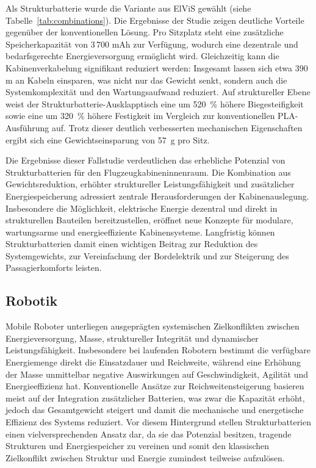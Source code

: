 Als Strukturbatterie wurde die Variante aus ElViS gewählt (siehe Tabelle~\ref{tab:combinations}). 
Die Ergebnisse der Studie zeigen deutliche Vorteile gegenüber der konventionellen Lösung. Pro Sitzplatz steht eine zusätzliche Speicherkapazität von 3\,700 mAh zur Verfügung, wodurch eine dezentrale und bedarfsgerechte Energieversorgung ermöglicht wird. Gleichzeitig kann die Kabinenverkabelung signifikant reduziert werden: Insgesamt lassen sich etwa 390 m an Kabeln einsparen, was nicht nur das Gewicht senkt, sondern auch die Systemkomplexität und den Wartungsaufwand reduziert. Auf struktureller Ebene weist der Strukturbatterie-Ausklapptisch eine um 520~\% höhere Biegesteifigkeit sowie eine um 320~\% höhere Festigkeit im Vergleich zur konventionellen PLA-Ausführung auf. Trotz dieser deutlich verbesserten mechanischen Eigenschaften ergibt sich eine Gewichtseinsparung von 57~g pro Sitz.

Die Ergebnisse dieser Fallstudie verdeutlichen das erhebliche Potenzial von Strukturbatterien für den Flugzeugkabineninnenraum. Die Kombination aus Gewichtsreduktion, erhöhter struktureller Leistungsfähigkeit und zusätzlicher Energiespeicherung adressiert zentrale Herausforderungen der Kabinenauslegung. Insbesondere die Möglichkeit, elektrische Energie dezentral und direkt in strukturellen Bauteilen bereitzustellen, eröffnet neue Konzepte für modulare, wartungsarme und energieeffiziente Kabinensysteme. Langfristig können Strukturbatterien damit einen wichtigen Beitrag zur Reduktion des Systemgewichts, zur Vereinfachung der Bordelektrik und zur Steigerung des Passagierkomforts leisten.

\subsection{Robotik}
Mobile Roboter unterliegen ausgeprägten systemischen Zielkonflikten zwischen Energieversorgung, Masse, struktureller Integrität und dynamischer Leistungsfähigkeit. Insbesondere bei laufenden Robotern bestimmt die verfügbare Energiemenge direkt die Einsatzdauer und Reichweite, während eine Erhöhung der Masse unmittelbar negative Auswirkungen auf Geschwindigkeit, Agilität und Energieeffizienz hat. Konventionelle Ansätze zur Reichweitensteigerung basieren meist auf der Integration zusätzlicher Batterien, was zwar die Kapazität erhöht, jedoch das Gesamtgewicht steigert und damit die mechanische und energetische Effizienz des Systems reduziert. Vor diesem Hintergrund stellen Strukturbatterien einen vielversprechenden Ansatz dar, da sie das Potenzial besitzen, tragende Strukturen und Energiespeicher zu vereinen und somit den klassischen Zielkonflikt zwischen Struktur und Energie zumindest teilweise aufzulösen.

